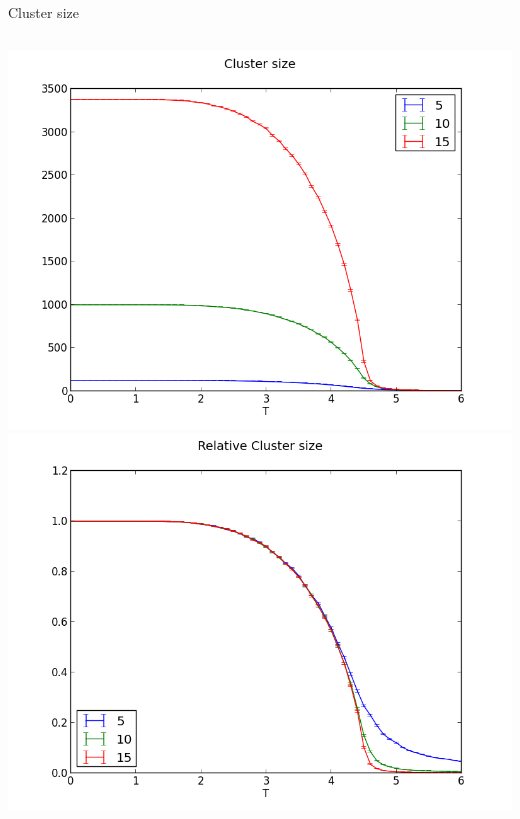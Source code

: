 \documentclass[]{beamer}
\begin{document}
\begin{frame}{Cluster size}
\begin{columns}[c]
	\pause
	\includegraphics[width=\textwidth]{../results/measurements/clusterSize.png}
	\pause
	\includegraphics[width=\textwidth]{../results/measurements/clusterSizeRelative.png}
\end{columns}
\note{ }
\end{frame}
\end{document}
